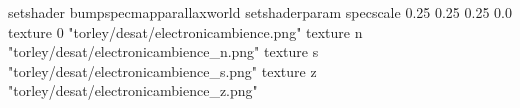 setshader bumpspecmapparallaxworld
setshaderparam specscale 0.25 0.25 0.25 0.0
texture 0 "torley/desat/electronicambience.png"
texture n "torley/desat/electronicambience_n.png"
texture s "torley/desat/electronicambience_s.png"
texture z "torley/desat/electronicambience_z.png"

